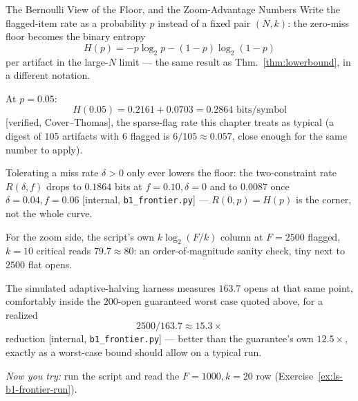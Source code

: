 \documentclass[11pt,a4paper]{article}
\theoremstyle{definition}
\theoremstyle{plain}
\begin{document}
%
\begin{pdexample}{The Bernoulli View of the Floor, and the Zoom-Advantage Numbers}
\setlength{\parskip}{4pt plus 1pt}
Write the flagged-item rate as a probability $p$ instead of a fixed pair $(N,k)$: the zero-miss floor becomes the binary entropy
\[
H(p)=-p\log_2p-(1-p)\log_2(1-p)
\]
per artifact in the large-$N$ limit --- the same result as Thm.~\ref{thm:lowerbound}, in a different notation.

At $p=0.05$:
\[
H(0.05)=0.2161+0.0703=0.2864 \text{ bits/symbol}
\]
[verified, Cover--Thomas], the sparse-flag rate this chapter treats as typical (a digest of $105$ artifacts with $6$ flagged is $6/105\approx0.057$, close enough for the same number to apply).

Tolerating a miss rate $\delta>0$ only ever lowers the floor: the two-constraint rate $R(\delta,f)$ drops to $0.1864$ bits at $f=0.10,\delta=0$ and to $0.0087$ once $\delta=0.04,f=0.06$ [internal, \texttt{b1\_frontier.py}] --- $R(0,p)=H(p)$ is the corner, not the whole curve.

For the zoom side, the script's own $k\log_2(F/k)$ column at $F=2500$ flagged, $k=10$ critical reads $79.7\approx80$: an order-of-magnitude sanity check, tiny next to $2500$ flat opens.

The simulated adaptive-halving harness measures $163.7$ opens at that same point, comfortably inside the $200$-open guaranteed worst case quoted above, for a realized
\[
2500/163.7\approx15.3\times
\]
reduction [internal, \texttt{b1\_frontier.py}] --- better than the guarantee's own $12.5\times$, exactly as a worst-case bound should allow on a typical run.

\emph{Now you try:} run the script and read the $F{=}1000,k{=}20$ row (Exercise~\ref{ex:ls-b1-frontier-run}).
\end{pdexample}
\end{document}
